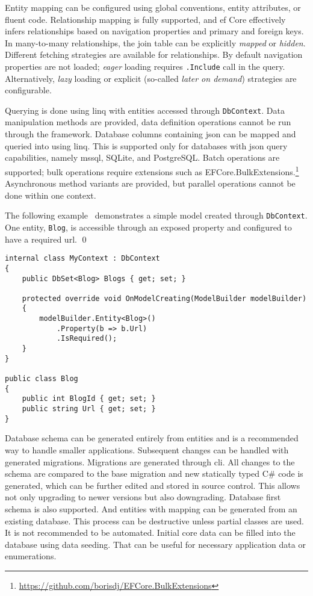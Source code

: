 Entity mapping can be configured using global conventions, entity attributes, or fluent code. Relationship mapping is fully supported, and \acrshort{ef} Core effectively infers relationships based on navigation properties and primary and foreign keys. In many-to-many relationships, the join table can be explicitly \textit{mapped} or \textit{hidden}. Different fetching strategies are available for relationships. By default navigation properties are not loaded; \textit{eager} loading requires \texttt{.Include} call in the query. Alternatively, \textit{lazy} loading or explicit (so-called \textit{later on demand}) strategies are configurable. 

Querying is done using \acrshort{linq} with entities accessed through \texttt{DbContext}. Data manipulation methods are provided, data definition operations cannot be run through the framework. Database columns containing \acrshort{json} can be mapped and queried into using \acrshort{linq}. This is supported only for databases with \acrshort{json} query capabilities, namely \acrshort{mssql}, SQLite, and PostgreSQL. Batch operations are supported; bulk operations require extensions such as EFCore.BulkExtensions.\footnote{\url{https://github.com/borisdj/EFCore.BulkExtensions}} Asynchronous method variants are provided, but parallel operations cannot be done within one context.

\begin{example}
\small
The following example~\cite{efcore} demonstrates a simple model created through \texttt{DbContext}. One entity, \texttt{Blog}, is accessible through an exposed property and configured to have a required \acrshort{url}.
\qed

\begin{lstlisting}[language=CSharp]
internal class MyContext : DbContext
{
    public DbSet<Blog> Blogs { get; set; }

    protected override void OnModelCreating(ModelBuilder modelBuilder)
    {
        modelBuilder.Entity<Blog>()
            .Property(b => b.Url)
            .IsRequired();
    }
}

public class Blog
{
    public int BlogId { get; set; }
    public string Url { get; set; }
}
\end{lstlisting}
\end{example}

Database schema can be generated entirely from entities and is a recommended way to handle smaller applications. Subsequent changes can be handled with generated migrations. Migrations are generated through \acrshort{cli}. All changes to the schema are compared to the base migration and new statically typed C\# code is generated, which can be further edited and stored in source control. This allows not only upgrading to newer versions but also downgrading. Database first schema is also supported. And entities with mapping can be generated from an existing database. This process can be destructive unless partial classes are used. It is not recommended to be automated. Initial core data can be filled into the database using data seeding. That can be useful for necessary application data or enumerations.

